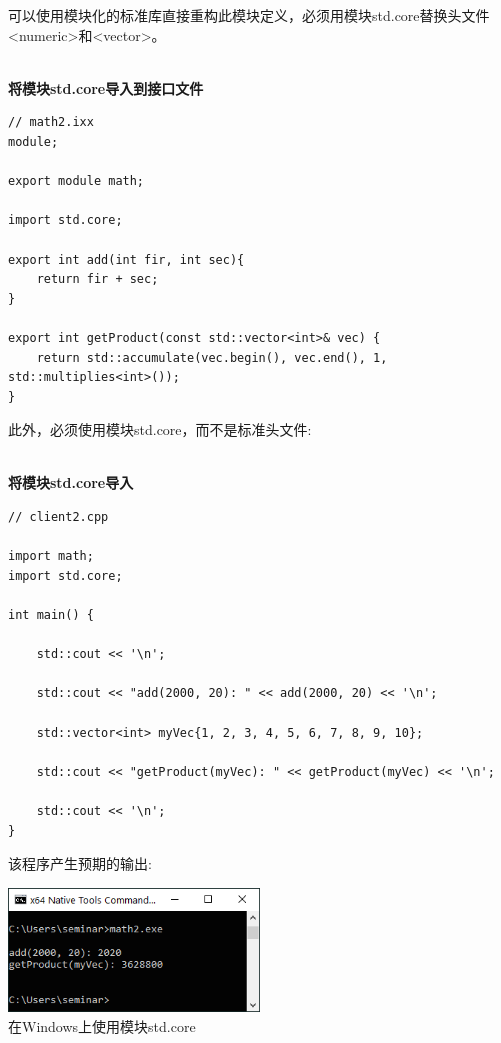 可以使用模块化的标准库直接重构此模块定义，必须用模块std.core替换头文件<numeric>和<vector>。

\hspace*{\fill} \\ %
\noindent
\textbf{将模块std.core导入到接口文件}
\begin{lstlisting}[style=styleCXX]
// math2.ixx
module;

export module math;

import std.core;

export int add(int fir, int sec){
	return fir + sec;
}

export int getProduct(const std::vector<int>& vec) {
	return std::accumulate(vec.begin(), vec.end(), 1, std::multiplies<int>());
}
\end{lstlisting}

此外，必须使用模块std.core，而不是标准头文件:

\hspace*{\fill} \\ %
\noindent
\textbf{将模块std.core导入}
\begin{lstlisting}[style=styleCXX]
// client2.cpp

import math;
import std.core;

int main() {
	
	std::cout << '\n';
	
	std::cout << "add(2000, 20): " << add(2000, 20) << '\n';
	
	std::vector<int> myVec{1, 2, 3, 4, 5, 6, 7, 8, 9, 10};
	
	std::cout << "getProduct(myVec): " << getProduct(myVec) << '\n';
	
	std::cout << '\n';
}
\end{lstlisting}

该程序产生预期的输出:

\begin{center}
\includegraphics[width=0.5\textwidth]{content/5/chapter8/images/7.png}\\
在Windows上使用模块std.core
\end{center}


